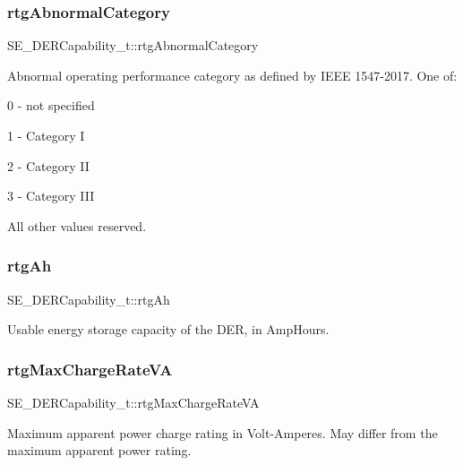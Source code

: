 \subsubsection{\texorpdfstring{rtg\+Abnormal\+Category}{rtgAbnormalCategory}}
{\footnotesize\ttfamily S\+E\+\_\+\+D\+E\+R\+Capability\+\_\+t\+::rtg\+Abnormal\+Category}

Abnormal operating performance category as defined by I\+E\+EE 1547-\/2017. One of\+:

0 -\/ not specified

1 -\/ Category I

2 -\/ Category II

3 -\/ Category I\+II

All other values reserved. \mbox{\label{group__DERCapability_ga259b7c7654bd92928ea31dac53ebda20}} 
\subsubsection{\texorpdfstring{rtg\+Ah}{rtgAh}}
{\footnotesize\ttfamily S\+E\+\_\+\+D\+E\+R\+Capability\+\_\+t\+::rtg\+Ah}

Usable energy storage capacity of the D\+ER, in Amp\+Hours. \mbox{\label{group__DERCapability_ga0e2378d8fdea4d48fb51d2f8d5b4b936}} 
\subsubsection{\texorpdfstring{rtg\+Max\+Charge\+Rate\+VA}{rtgMaxChargeRateVA}}
{\footnotesize\ttfamily S\+E\+\_\+\+D\+E\+R\+Capability\+\_\+t\+::rtg\+Max\+Charge\+Rate\+VA}

Maximum apparent power charge rating in Volt-\/\+Amperes. May differ from the maximum apparent power rating. \mbox{\label{group__DERCapability_ga36c8c55fa197038f70f83697f985446d}} 
